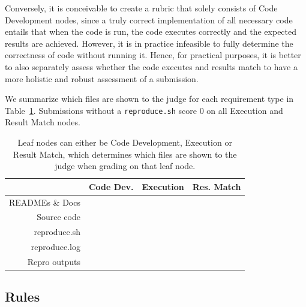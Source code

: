 \documentclass{article}
\newcommand{\cmark}{\ding{51}}%
\newcommand{\xmark}{\ding{55}}%
\theoremstyle{plain}
\theoremstyle{definition}
\theoremstyle{remark}
\begin{document}
Conversely, it is conceivable to create a rubric that solely consists of Code Development nodes, since a truly correct implementation of all necessary code entails that when the code is run, the code executes correctly and the expected results are achieved. However, it is in practice infeasible to fully determine the correctness of code without running it. Hence, for practical purposes, it is better to also separately assess whether the code executes and results match to have a more holistic and robust assessment of a submission.

We summarize which files are shown to the judge for each requirement type in Table~\ref{tab:node-files}. Submissions without a \texttt{reproduce.sh} score 0 on all Execution and Result Match nodes.

\begin{table}[htb]
\caption{Leaf nodes can either be Code Development, Execution or Result Match, which determines which files are shown to the judge when grading on that leaf node.}
\label{tab:node-files}
\begin{small}
\begin{tabular}{@{}rccc@{}}
\toprule
                                          & Code Dev. & Execution & Res. Match \\ \midrule
READMEs \& Docs                                      & \cmark       & \cmark     & \cmark      \\
Source code                               & \cmark       & \cmark     & \xmark          \\
reproduce.sh                              & \cmark       & \cmark     & \cmark      \\
reproduce.log                             & \xmark           & \cmark     & \cmark      \\
Repro outputs                      & \xmark           & \xmark         & \cmark      \\ \bottomrule
\end{tabular}
\end{small}
\end{table}


\subsection{Rules}
\label{sec: rules}
\end{document}
